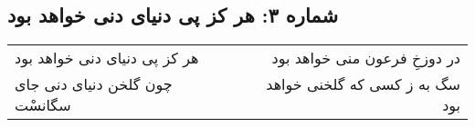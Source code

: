 \begin{center}
\section*{شماره ۳: هر کز پی دنیای دنی خواهد بود}
\label{sec:003}
\begin{longtable}{l p{0.5cm} r}
هر کز پی دنیای دنی خواهد بود
&&
در دوزخِ فرعون منی خواهد بود
\\
چون گلخن دنیای دنی جای سگانسْت
&&
سگ به ز کسی که گلخنی خواهد بود
\\
\end{longtable}
\end{center}
